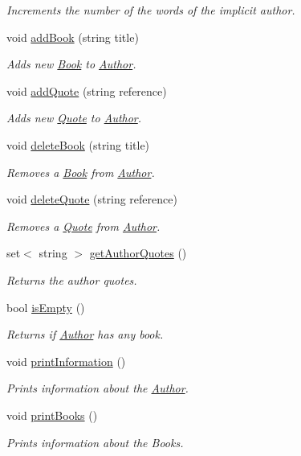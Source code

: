 \begin{DoxyCompactItemize}
\begin{DoxyCompactList}\small\item\em Increments the number of the words of the implicit author. \end{DoxyCompactList}\item 
void \hyperlink{class_author_a5836c0e00e740d4e9e9049e94f032cc3}{add\+Book} (string title)
\begin{DoxyCompactList}\small\item\em Adds new \hyperlink{class_book}{Book} to \hyperlink{class_author}{Author}. \end{DoxyCompactList}\item 
void \hyperlink{class_author_a8605dbbab320ca251f3c64e782cf40b3}{add\+Quote} (string reference)
\begin{DoxyCompactList}\small\item\em Adds new \hyperlink{class_quote}{Quote} to \hyperlink{class_author}{Author}. \end{DoxyCompactList}\item 
void \hyperlink{class_author_ad48c2d5ae47d521bf5d4aa638bb86976}{delete\+Book} (string title)
\begin{DoxyCompactList}\small\item\em Removes a \hyperlink{class_book}{Book} from \hyperlink{class_author}{Author}. \end{DoxyCompactList}\item 
void \hyperlink{class_author_a41078931f76f02641f92521a3da5b286}{delete\+Quote} (string reference)
\begin{DoxyCompactList}\small\item\em Removes a \hyperlink{class_quote}{Quote} from \hyperlink{class_author}{Author}. \end{DoxyCompactList}\item 
set$<$ string $>$ \hyperlink{class_author_a81435140eb694eb7ed54ea567aa38984}{get\+Author\+Quotes} ()
\begin{DoxyCompactList}\small\item\em Returns the author quotes. \end{DoxyCompactList}\item 
bool \hyperlink{class_author_ab0752a3f061a07c6460e52e4386ea5c3}{is\+Empty} ()
\begin{DoxyCompactList}\small\item\em Returns if \hyperlink{class_author}{Author} has any book. \end{DoxyCompactList}\item 
void \hyperlink{class_author_a9dff52e2a8bd67ff4509eb00f9235155}{print\+Information} ()
\begin{DoxyCompactList}\small\item\em Prints information about the \hyperlink{class_author}{Author}. \end{DoxyCompactList}\item 
void \hyperlink{class_author_a108714e7e120b05eaf431bb4a55b9383}{print\+Books} ()
\begin{DoxyCompactList}\small\item\em Prints information about the Books. \end{DoxyCompactList}\end{DoxyCompactItemize}
